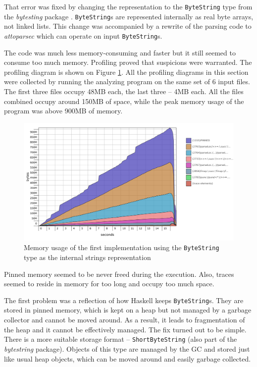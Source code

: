 That error was fixed by changing the representation to the \texttt{ByteString} type from the \emph{bytesting} 
package \cite{haskell:bytestring}. \texttt{ByteString}s are represented internally as real byte arrays,
not linked lists. 
This change was accompanied by a rewrite of the parsing code to \emph{attoparsec} \cite{haskell:attoparsec}
which can operate on input \texttt{ByteString}s.

The code was much less memory-consuming and faster but it still seemed to consume too much memory.
Profiling proved that suspicions were warranted. The profiling diagram is shown on Figure \ref{fig:bytestring-lazy}. 
All the profiling diagrams in this section were collected by running the analyzing program on the same set of 6 input files.
The first three files occupy 48MB each, the last three -- 4MB each.
All the files combined occupy around 150MB of space, while the peak memory usage of the program 
was above 900MB of memory.

\begin{figure}[hbt!]
 \centering
 \includegraphics[width=\textwidth]{png/bytestring-lazy}
 \caption{Memory usage of the first implementation using the \texttt{ByteString} type as the internal strings representation}
 \label{fig:bytestring-lazy}
\end{figure}

Pinned memory seemed to be never freed during the execution. 
Also, traces seemed to reside in memory for too long and occupy too much space. 

The first problem was a reflection of how Haskell keeps \texttt{ByteString}s.
They are stored in pinned memory, which is kept on a heap but 
not managed by a garbage collector \cite{haskell:shortbytestring-and-text} and cannot be moved around.
As a result, it leads to fragmentation of the heap and it cannot be effectively managed.
The fix turned out to be simple. There is a more suitable storage format -- \texttt{ShortByteString} 
(also part of the \emph{bytestring} package). Objects of this type are managed
by the GC and stored just like usual heap objects, which can be moved around and easily garbage collected.


